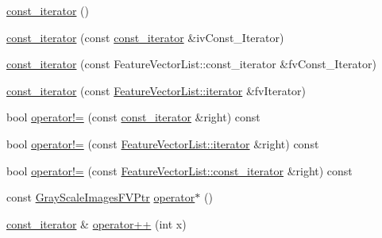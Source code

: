 \begin{DoxyCompactItemize}
\item 
\hyperlink{class_k_k_m_l_l_1_1_gray_scale_images_f_v_list_1_1const__iterator_a9d25f2bf95637f492d9bc137af79c271}{const\+\_\+iterator} ()
\item 
\hyperlink{class_k_k_m_l_l_1_1_gray_scale_images_f_v_list_1_1const__iterator_a1a8e19b41d3a72207b86766ccbd91344}{const\+\_\+iterator} (const \hyperlink{class_k_k_m_l_l_1_1_gray_scale_images_f_v_list_1_1const__iterator}{const\+\_\+iterator} \&iv\+Const\+\_\+\+Iterator)
\item 
\hyperlink{class_k_k_m_l_l_1_1_gray_scale_images_f_v_list_1_1const__iterator_abce34c79c56cf7a6a6921e91d154055c}{const\+\_\+iterator} (const Feature\+Vector\+List\+::const\+\_\+iterator \&fv\+Const\+\_\+\+Iterator)
\item 
\hyperlink{class_k_k_m_l_l_1_1_gray_scale_images_f_v_list_1_1const__iterator_a82130c6c06a8e3d2dea920da6afbcbff}{const\+\_\+iterator} (const \hyperlink{class_k_k_b_1_1_k_k_queue_aa3c2796a726eea468b94132a9fbf2cfe}{Feature\+Vector\+List\+::iterator} \&fv\+Iterator)
\item 
bool \hyperlink{class_k_k_m_l_l_1_1_gray_scale_images_f_v_list_1_1const__iterator_af220ce8900de21e274513adbe5e84ad1}{operator!=} (const \hyperlink{class_k_k_m_l_l_1_1_gray_scale_images_f_v_list_1_1const__iterator}{const\+\_\+iterator} \&right) const 
\item 
bool \hyperlink{class_k_k_m_l_l_1_1_gray_scale_images_f_v_list_1_1const__iterator_af9a067fd340d4960f14e14a53fcf9d37}{operator!=} (const \hyperlink{class_k_k_b_1_1_k_k_queue_aa3c2796a726eea468b94132a9fbf2cfe}{Feature\+Vector\+List\+::iterator} \&right) const 
\item 
bool \hyperlink{class_k_k_m_l_l_1_1_gray_scale_images_f_v_list_1_1const__iterator_ab0c74390bd6b459e514e03ec76a366f8}{operator!=} (const \hyperlink{class_k_k_b_1_1_k_k_queue_aeb057c9c010446f46f57c1e355f981f1}{Feature\+Vector\+List\+::const\+\_\+iterator} \&right) const 
\item 
const \hyperlink{namespace_k_k_m_l_l_ac3f21d259a7b1893920f27296d70bc6e}{Gray\+Scale\+Images\+F\+V\+Ptr} \hyperlink{class_k_k_m_l_l_1_1_gray_scale_images_f_v_list_1_1const__iterator_a33d613364100bc065334b356387734df}{operator$\ast$} ()
\item 
\hyperlink{class_k_k_m_l_l_1_1_gray_scale_images_f_v_list_1_1const__iterator}{const\+\_\+iterator} \& \hyperlink{class_k_k_m_l_l_1_1_gray_scale_images_f_v_list_1_1const__iterator_af2de0550f009b435d0f930fa24c2ee3b}{operator++} (int x)

\end{DoxyCompactItemize}
